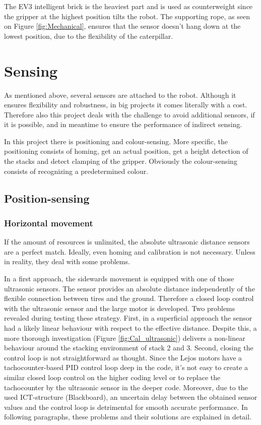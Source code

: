 \documentclass{article}
\begin{document}
	\par The EV3 intelligent brick is the heaviest part and is used as counterweight since the gripper at the highest position tilts the robot. The supporting rope, as seen on Figure \ref{fig:Mechanical}, ensures that the sensor doesn't hang down at the lowest position, due to the flexibility of the caterpillar.
	
	\section{Sensing}
	\par As mentioned above, several sensors are attached to the robot. Although it ensures flexibility and robustness, in big projects it comes literally with a cost. Therefore also this project deals with the challenge to avoid additional sensors, if it is possible, and in meantime to ensure the performance of indirect sensing. 
	
	\par In this project there is positioning and colour-sensing. More specific, the positioning consists of homing, get an actual position, get a height detection of the stacks and detect clamping of the gripper. Obviously the colour-sensing consists of recognizing a predetermined colour.
	
	\subsection{Position-sensing}
	\subsubsection{Horizontal movement}
	\par If the amount of resources is unlimited, the absolute ultrasonic distance sensors are a perfect match. Ideally, even homing and calibration is not necessary. Unless in reality, they deal with some problems.
	
	\par In a first approach, the sidewards movement is equipped with one of those ultrasonic sensors. The sensor provides an absolute distance independently of the flexible connection between tires and the ground. Therefore a closed loop control with the ultrasonic sensor and the large motor is developed. Two problems revealed during testing these strategy. First, in a superficial approach the sensor had a likely linear behaviour with respect to the effective distance. Despite this, a more thorough investigation (Figure \ref{fig:Cal_ultrasonic}) delivers a non-linear behaviour around the stacking environment of stack 2 and 3. Second, closing the control loop is not straightforward as thought. Since the Lejos motors have a tachocounter-based PID control loop deep in the code, it's not easy to create a similar closed loop control on the higher coding level or to replace the tachocounter by the ultrasonic sensor in the deeper code. Moreover, due to the used ICT-structure (Blackboard), an uncertain delay between the obtained sensor values and the control loop is detrimental for smooth accurate performance. In following paragraphs, these problems and their solutions are explained in detail.
	
\end{document}
